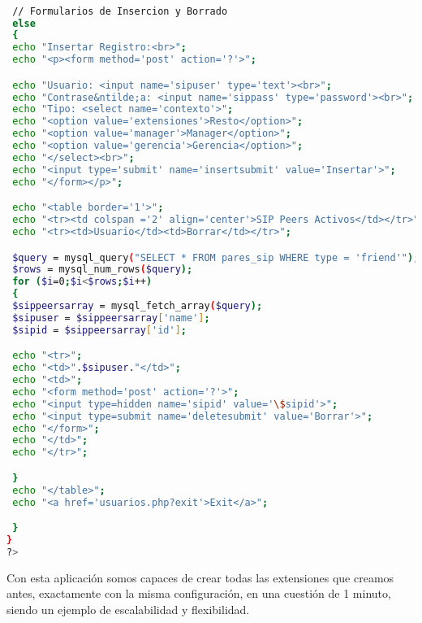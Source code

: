 \begin{lstlisting}[language=bash,title={./www/usuarios.php}]

 // Formularios de Insercion y Borrado
 else
 {
 echo "Insertar Registro:<br>";
 echo "<p><form method='post' action='?'>";

 echo "Usuario: <input name='sipuser' type='text'><br>";
 echo "Contrase&ntilde;a: <input name='sippass' type='password'><br>";
 echo "Tipo: <select name='contexto'>";
 echo "<option value='extensiones'>Resto</option>";
 echo "<option value='manager'>Manager</option>";
 echo "<option value='gerencia'>Gerencia</option>";
 echo "</select><br>";
 echo "<input type='submit' name='insertsubmit' value='Insertar'>";
 echo "</form></p>";

 echo "<table border='1'>";
 echo "<tr><td colspan ='2' align='center'>SIP Peers Activos</td></tr>";
 echo "<tr><td>Usuario</td><td>Borrar</td></tr>";

 $query = mysql_query("SELECT * FROM pares_sip WHERE type = 'friend'");
 $rows = mysql_num_rows($query);
 for ($i=0;$i<$rows;$i++)
 {
 $sippeersarray = mysql_fetch_array($query);
 $sipuser = $sippeersarray['name'];
 $sipid = $sippeersarray['id'];

 echo "<tr>";
 echo "<td>".$sipuser."</td>";
 echo "<td>";
 echo "<form method='post' action='?'>";
 echo "<input type=hidden name='sipid' value='\$sipid'>";
 echo "<input type=submit name='deletesubmit' value='Borrar'>";
 echo "</form>";
 echo "</td>";
 echo "</tr>";

 }
 echo "</table>";
 echo "<a href='usuarios.php?exit'>Exit</a>";

 }
}
?>

\end{lstlisting}

Con esta aplicación somos capaces de crear todas las extensiones que creamos antes, exactamente con la misma configuración, en una cuestión de 1 minuto, siendo un ejemplo de escalabilidad y flexibilidad.


